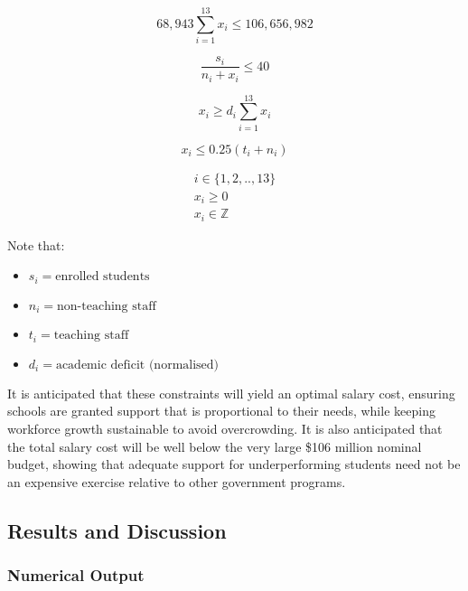 \documentclass[11pt, a4paper]{article}
\begin{document}
    \begin{equation}
        68,943\sum_{i=1}^{13} x_i \leq 106,656,982
        \label{first_constraint3}
    \end{equation}

    \begin{equation}
        \frac{s_i}{n_i + x_i} \leq 40
    \end{equation}

    \begin{equation}
        x_i \geq d_i\sum_{i=1}^{13} x_i
    \end{equation}

    \begin{equation}
        x_i \leq 0.25(t_i + n_i)
        \label{last_constraint3}
    \end{equation}

    \begin{gather}
        i \in \{1, 2, .., 13\} \\
        x_i \geq 0 \\
        x_i \in \mathbb{Z}            
    \end{gather}

    Note that:

    \begin{itemize}
        \item $s_i = \textrm{enrolled students}$
        \item $n_i = \textrm{non-teaching staff}$
        \item $t_i = \textrm{teaching staff}$
        \item $d_i = \textrm{academic deficit (normalised)}$
    \end{itemize}

    It is anticipated that these constraints will yield an optimal salary cost, ensuring schools are granted support that is proportional to their needs, while keeping workforce growth sustainable to avoid overcrowding. It is also anticipated that the total salary cost will be well below the very large \$106 million nominal budget, showing that adequate support for underperforming students need not be an expensive exercise relative to other government programs.

    \subsection{Results and Discussion}

    \subsubsection{Numerical Output}
\end{document}

